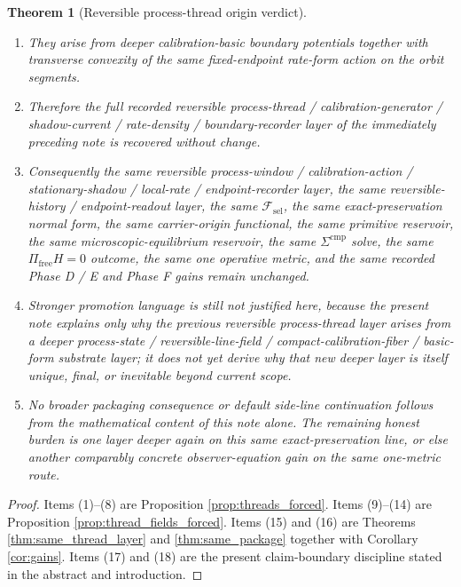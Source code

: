 \documentclass[11pt]{article}
\newcommand{\StemFunctional}{\mathscr F_{\mathrm{sel}}}
\newtheorem{theorem}{Theorem}
\begin{document}
\begin{theorem}[Reversible process-thread origin verdict]
\begin{enumerate}
    \item They arise from deeper calibration-basic boundary potentials together with transverse convexity of the same fixed-endpoint rate-form action on the orbit segments.
    \item Therefore the full recorded reversible process-thread / calibration-generator / shadow-current / rate-density / boundary-recorder layer of the immediately preceding note is recovered without change.
    \item Consequently the same reversible process-window / calibration-action / stationary-shadow / local-rate / endpoint-recorder layer, the same reversible-history / endpoint-readout layer, the same \(\StemFunctional\), the same exact-preservation normal form, the same carrier-origin functional, the same primitive reservoir, the same microscopic-equilibrium reservoir, the same \(\Sigma^{\mathrm{cmp}}\) solve, the same \(\Pi_{\mathrm{free}}H=0\) outcome, the same one operative metric, and the same recorded Phase D / E and Phase F gains remain unchanged.
    \item Stronger promotion language is still not justified here, because the present note explains only why the previous reversible process-thread layer arises from a deeper process-state / reversible-line-field / compact-calibration-fiber / basic-form substrate layer; it does not yet derive why that new deeper layer is itself unique, final, or inevitable beyond current scope.
    \item No broader packaging consequence or default side-line continuation follows from the mathematical content of this note alone. The remaining honest burden is one layer deeper again on this same exact-preservation line, or else another comparably concrete observer-equation gain on the same one-metric route.
\end{enumerate}
\end{theorem}

\begin{proof}
Items (1)--(8) are Proposition \ref{prop:threads_forced}. Items (9)--(14) are Proposition \ref{prop:thread_fields_forced}. Items (15) and (16) are Theorems \ref{thm:same_thread_layer} and \ref{thm:same_package} together with Corollary \ref{cor:gains}. Items (17) and (18) are the present claim-boundary discipline stated in the abstract and introduction.
\end{proof}
\end{document}
